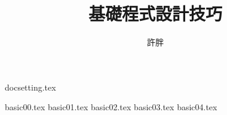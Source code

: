 \documentclass[12pt,a4paper,oneside]{article}
\begin{document}
\begin{CJK}{UTF8}{bkai}

{docsetting.tex}

\title{基礎程式設計技巧}
\author{許胖}

\maketitle

\begin{multicols}{2}
\tableofcontents
\end{multicols}

{basic00.tex}
{basic01.tex}
{basic02.tex}
{basic03.tex}
{basic04.tex}

\printindex

\clearpage
\end{CJK}
\end{document}
